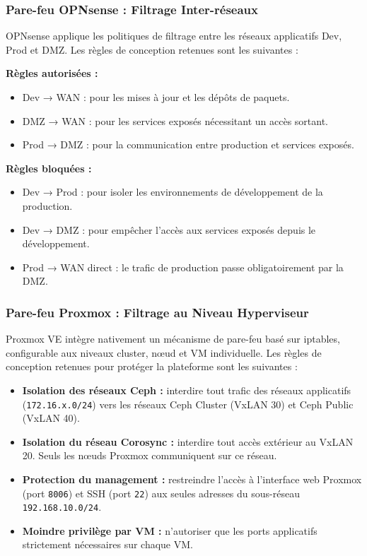 \subsubsection{Pare-feu OPNsense : Filtrage Inter-réseaux}

\par OPNsense applique les politiques de filtrage entre les réseaux applicatifs Dev, Prod et DMZ. Les règles de conception retenues sont les suivantes :\\

\par \textbf{Règles autorisées :}
\begin{itemize}
    \item Dev → WAN : pour les mises à jour et les dépôts de paquets.
    \item DMZ → WAN : pour les services exposés nécessitant un accès sortant.
    \item Prod → DMZ : pour la communication entre production et services exposés.
\end{itemize}

\par \textbf{Règles bloquées :}
\begin{itemize}
    \item Dev → Prod : pour isoler les environnements de développement de la production.
    \item Dev → DMZ : pour empêcher l'accès aux services exposés depuis le développement.
    \item Prod → WAN direct : le trafic de production passe obligatoirement par la DMZ.
\end{itemize}

\subsubsection{Pare-feu Proxmox : Filtrage au Niveau Hyperviseur}

\par Proxmox VE intègre nativement un mécanisme de pare-feu basé sur iptables, configurable aux niveaux cluster, nœud et VM individuelle. Les règles de conception retenues pour protéger la plateforme sont les suivantes :\\

\begin{itemize}
    \item \textbf{Isolation des réseaux Ceph :} interdire tout trafic des réseaux applicatifs (\texttt{172.16.x.0/24}) vers les réseaux Ceph Cluster (VxLAN 30) et Ceph Public (VxLAN 40).
    \item \textbf{Isolation du réseau Corosync :} interdire tout accès extérieur au VxLAN 20. Seuls les nœuds Proxmox communiquent sur ce réseau.
    \item \textbf{Protection du management :} restreindre l'accès à l'interface web Proxmox (port \texttt{8006}) et SSH (port \texttt{22}) aux seules adresses du sous-réseau \texttt{192.168.10.0/24}.
    \item \textbf{Moindre privilège par VM :} n'autoriser que les ports applicatifs strictement nécessaires sur chaque VM.
\end{itemize}


